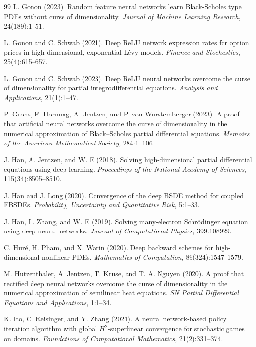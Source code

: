 \documentclass[11pt]{article}
\theoremstyle{definition}
\theoremstyle{plain}
\begin{document}
\begin{appendices}
\begin{thebibliography}{99}
 L. Gonon (2023). \newblock Random feature neural networks learn Black-Scholes type PDEs without curse of dimensionality. \newblock \emph{Journal of Machine Learning Research}, 24(189):1--51.

 L. Gonon and C. Schwab (2021). \newblock Deep ReLU network expression rates for option prices in high-dimensional, exponential Lévy models. \newblock \emph{Finance and Stochastics}, 25(4):615--657.

 L. Gonon and C. Schwab (2023). \newblock Deep ReLU neural networks overcome the curse of dimensionality for partial integrodifferential equations. \newblock \emph{Analysis and Applications}, 21(1):1--47.

 P. Grohs, F. Hornung, A. Jentzen, and P. von Wurstemberger (2023). \newblock A proof that artificial neural networks overcome the curse of dimensionality in the numerical approximation of Black--Scholes partial differential equations. \newblock \emph{Memoirs of the American Mathematical Society}, 284:1--106.

 J. Han, A. Jentzen, and W. E (2018). \newblock Solving high-dimensional partial differential equations using deep learning. \newblock \emph{Proceedings of the National Academy of Sciences}, 115(34):8505--8510.

 J. Han and J. Long (2020). \newblock Convergence of the deep BSDE method for coupled FBSDEs. \newblock \emph{Probability, Uncertainty and Quantitative Risk}, 5:1--33.

 J. Han, L. Zhang, and W. E (2019). \newblock Solving many-electron Schrödinger equation using deep neural networks. \newblock \emph{Journal of Computational Physics}, 399:108929.

 C. Huré, H. Pham, and X. Warin (2020). \newblock Deep backward schemes for high-dimensional nonlinear PDEs. \newblock \emph{Mathematics of Computation}, 89(324):1547--1579.

 M. Hutzenthaler, A. Jentzen, T. Kruse, and T. A. Nguyen (2020). \newblock A proof that rectified deep neural networks overcome the curse of dimensionality in the numerical approximation of semilinear heat equations. \newblock \emph{SN Partial Differential Equations and Applications}, 1:1--34.

 K. Ito, C. Reisinger, and Y. Zhang (2021). \newblock A neural network-based policy iteration algorithm with global $H^2$-superlinear convergence for stochastic games on domains. \newblock \emph{Foundations of Computational Mathematics}, 21(2):331--374.


\end{thebibliography}
\end{appendices}
\end{document}
